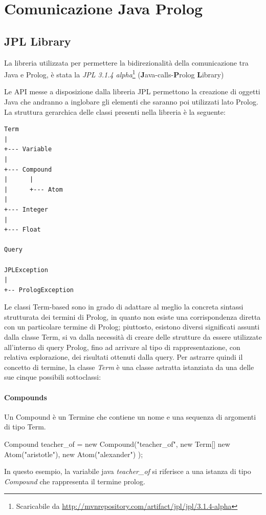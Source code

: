 \section{Comunicazione Java Prolog}
\label{java-prolog}
\subsection{JPL Library}
\nocite{swi:jpl}
La libreria utilizzata per permettere la bidirezionalità della comunicazione tra Java e Prolog, è stata la \emph{JPL 3.1.4 alpha}\footnote{Scaricabile da \url{http://mvnrepository.com/artifact/jpl/jpl/3.1.4-alpha}} (\textbf{J}ava-calls-\textbf{P}rolog \textbf{L}ibrary)

Le API messe a disposizione dalla libreria JPL permettono la creazione di oggetti Java che andranno a inglobare gli elementi che saranno poi utilizzati lato Prolog. La struttura gerarchica delle classi presenti nella libreria è la seguente:
\begin{Verbatim}
Term
|
+--- Variable
|
+--- Compound
|      |
|      +--- Atom
|
+--- Integer
|
+--- Float

Query

JPLException
|
+-- PrologException
\end{Verbatim}

Le classi Term-based sono in grado di adattare al meglio la concreta sintassi strutturata dei termini di Prolog, in quanto non esiste una corrispondenza diretta con un particolare termine di Prolog; piuttosto, esistono diversi significati assunti dalla classe Term, si va dalla necessità di creare delle strutture da essere utilizzate all'interno di query Prolog, fino ad arrivare al tipo di rappresentazione, con relativa esplorazione, dei risultati ottenuti dalla query.
Per astrarre quindi il concetto di termine, la classe \emph{Term} è una classe astratta istanziata da una delle sue cinque possibili sottoclassi:
\paragraph{Compounds}
Un Compound è un Termine che contiene un nome e una sequenza di argomenti di tipo Term.

\begin{javacode}
	Compound teacher_of = new Compound("teacher_of",
	new Term[] {
		new Atom("aristotle"),
		new Atom("alexander")
	}
	);
\end{javacode}

In questo esempio, la variabile java \emph{teacher\_of} si riferisce a una istanza di tipo \emph{Compound} che rappresenta il termine prolog.

